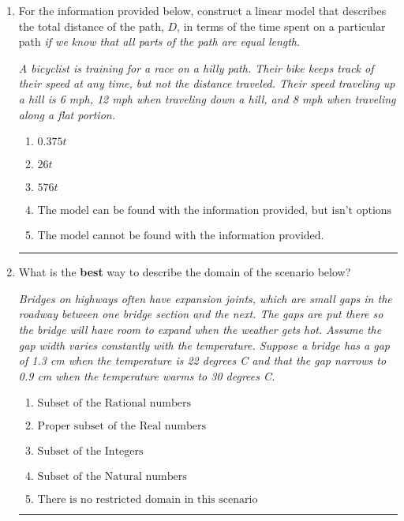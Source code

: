 \documentclass[14pt]{extbook}
\newcommand{\litem}[1]{\item#1\hspace*{-1cm}\rule{\textwidth}{0.4pt}}
\begin{document}
\begin{enumerate}
{\begin{enumerate}[label=\Alph*.]
\end{enumerate} }
\litem{
For the information provided below, construct a linear model that describes the total distance of the path, $D$, in terms of the time spent on a particular path \textit{if we know that all parts of the path are equal length}.
\begin{center}
    \textit{ A bicyclist is training for a race on a hilly path. Their bike keeps track of their speed at any time, but not the distance traveled. Their speed traveling up a hill is 6 mph, 12 mph when traveling down a hill, and 8 mph when traveling along a flat portion. }
\end{center}
\begin{enumerate}[label=\Alph*.]
\item \( 0.375 t \)
\item \( 26 t \)
\item \( 576 t \)
\item \( \text{The model can be found with the information provided, but isn't options 1-3.} \)
\item \( \text{The model cannot be found with the information provided.} \)

\end{enumerate} }
\litem{
What is the \textbf{best} way to describe the domain of the scenario below?
\begin{center}
    \textit{ Bridges on highways often have expansion joints, which are small gaps in the roadway between one bridge section and the next. The gaps are put there so the bridge will have room to expand when the weather gets hot. Assume the gap width varies constantly with the temperature. Suppose a bridge has a gap of 1.3 cm when the temperature is 22 degrees C and that the gap narrows to 0.9 cm when the temperature warms to 30 degrees C. }
\end{center}
\begin{enumerate}[label=\Alph*.]
\item \( \text{Subset of the Rational numbers} \)
\item \( \text{Proper subset of the Real numbers} \)
\item \( \text{Subset of the Integers} \)
\item \( \text{Subset of the Natural numbers} \)
\item \( \text{There is no restricted domain in this scenario} \)


\end{enumerate}}
\end{enumerate}
\end{document}
